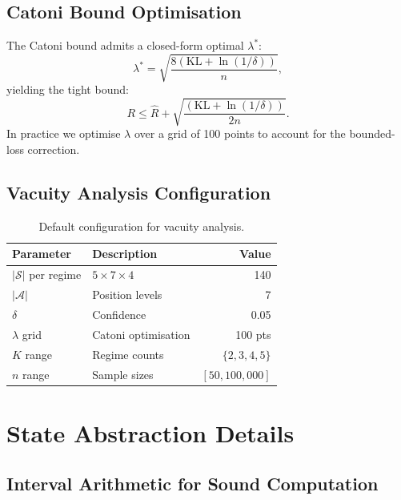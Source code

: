 \documentclass[11pt]{article}
\newcommand{\KL}{\mathrm{KL}}
\newcommand{\cA}{\mathcal{A}}
\newcommand{\cS}{\mathcal{S}}
\begin{document}
\subsection{Catoni Bound Optimisation}

The Catoni bound admits a closed-form optimal $\lambda^*$:
\begin{equation}
  \lambda^* = \sqrt{\frac{8(\KL + \ln(1/\delta))}{n}},
\end{equation}
yielding the tight bound:
\begin{equation}
  R \leq \hat{R} + \sqrt{\frac{(\KL + \ln(1/\delta))}{2n}}.
\end{equation}
In practice we optimise $\lambda$ over a grid of 100 points to
account for the bounded-loss correction.

\subsection{Vacuity Analysis Configuration}

\begin{table}[h]
\centering
\caption{Default configuration for vacuity
analysis.}\label{tab:vacconfig}
\small
\begin{tabular}{@{}llr@{}}
\toprule
\textbf{Parameter} & \textbf{Description} & \textbf{Value} \\
\midrule
$|\cS|$ per regime & $5 \times 7 \times 4$ & 140 \\
$|\cA|$ & Position levels & 7 \\
$\delta$ & Confidence & 0.05 \\
$\lambda$ grid & Catoni optimisation & 100 pts \\
$K$ range & Regime counts & $\{2, 3, 4, 5\}$ \\
$n$ range & Sample sizes & $[50, 100{,}000]$ \\
\bottomrule
\end{tabular}
\end{table}


\section{State Abstraction Details}\label{app:abstraction}

\subsection{Interval Arithmetic for Sound Computation}
\end{document}
